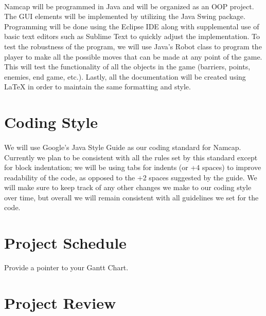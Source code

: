 \documentclass{article}
\begin{document}
\paragraph{}
Namcap will be programmed in Java and will be organized as an OOP project. The GUI elements will be implemented by utilizing the Java Swing package. Programming will be done using the Eclipse IDE along with supplemental use of basic text editors such as Sublime Text to quickly adjust the implementation. To test the robustness of the program, we will use Java's Robot class to program the player to make all the possible moves that can be made at any point of the game. This will test the functionality of all the objects in the game (barriers, points, enemies, end game, etc.). Lastly, all the documentation will be created using LaTeX in order to maintain the same formatting and style.

\section{Coding Style}

\paragraph{}
We will use Google's Java Style Guide as our coding standard for Namcap. Currently we plan to be consistent with all the rules set by this standard except for block indentation; we will be using tabs for indents (or +4 spaces) to improve readability of the code, as opposed to the +2 spaces suggested by the guide. We will make sure to keep track of any other changes we make to our coding style over time, but overall we will remain consistent with all guidelines we set for the code.

\section{Project Schedule}

Provide a pointer to your Gantt Chart.

\section{Project Review}
\end{document}
